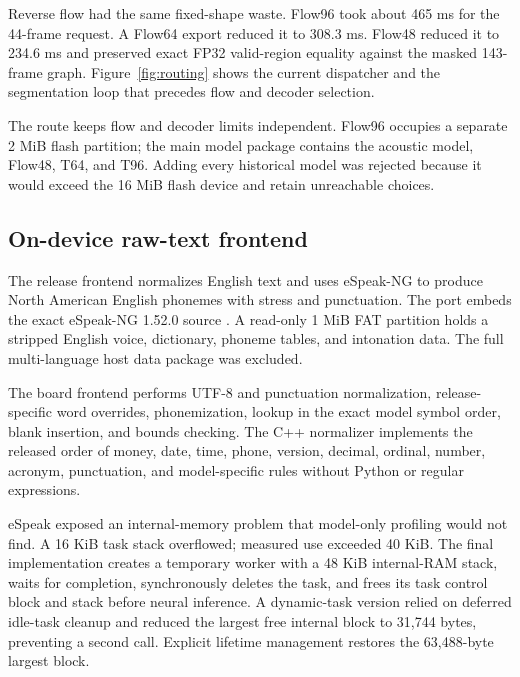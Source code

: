 \documentclass[10pt]{article}
\begin{document}
\noindent\begin{minipage}{\linewidth}
\setlength{\parindent}{1em}
Reverse flow had the same fixed-shape waste. Flow96 took about 465 ms for the
44-frame request. A Flow64 export reduced it to 308.3 ms. Flow48 reduced it to
234.6 ms and preserved exact FP32 valid-region equality against the masked
143-frame graph. Figure~\ref{fig:routing} shows the current dispatcher and
the segmentation loop that precedes flow and decoder selection.
\end{minipage}

The route keeps flow and decoder limits independent. Flow96 occupies a
separate 2 MiB flash partition; the main model package contains the acoustic
model, Flow48, T64, and T96. Adding every historical model was rejected because
it would exceed the 16 MiB flash device and retain unreachable choices.

\subsection{On-device raw-text frontend}

The release frontend normalizes English text and uses eSpeak-NG to produce
North American English phonemes with stress and punctuation. The port embeds
the exact eSpeak-NG 1.52.0 source \cite{espeakng2026}. A read-only 1 MiB FAT
partition holds a stripped English voice, dictionary, phoneme tables, and
intonation data. The full multi-language host data package was excluded.

The board frontend performs UTF-8 and punctuation normalization, release-
specific word overrides, phonemization, lookup in the exact model symbol
order, blank insertion, and bounds checking. The C++ normalizer implements
the released order of money, date, time, phone, version, decimal, ordinal,
number, acronym, punctuation, and model-specific rules without Python or
regular expressions.

eSpeak exposed an internal-memory problem that model-only profiling would not
find. A 16 KiB task stack overflowed; measured use exceeded 40 KiB. The final
implementation creates a temporary worker with a 48 KiB internal-RAM stack,
waits for completion, synchronously deletes the task, and frees its task
control block and stack before neural inference. A dynamic-task version relied
on deferred idle-task cleanup and reduced the largest free internal block to
31,744 bytes, preventing a second call. Explicit lifetime management restores
the 63,488-byte largest block.
\end{document}
